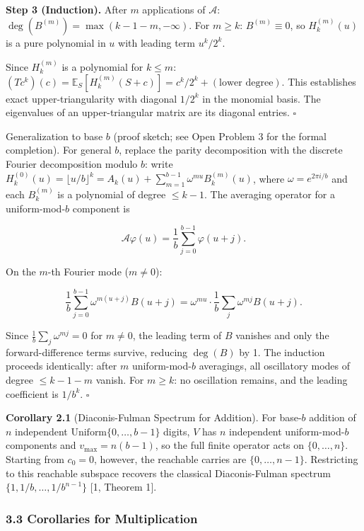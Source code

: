 \documentclass[
  11pt,
]{article}
\begin{document}
\textbf{Step 3 (Induction).} After \(m\) applications of \(\mathcal{A}\):
\(\deg(B^{(m)}) = \max(k - 1 - m, -\infty)\). For \(m \geq k\):
\(B^{(m)} \equiv 0\), so \(H_k^{(m)}(u)\) is a pure polynomial in \(u\) with
leading term \(u^k/2^k\).

Since \(H_k^{(m)}\) is a polynomial for \(k \leq m\):
\((Tc^k)(c) = \mathbb{E}_S[H_k^{(m)}(S+c)] = c^k/2^k + (\text{lower degree})\).
This establishes exact upper-triangularity with diagonal \(1/2^k\) in the
monomial basis. The eigenvalues of an upper-triangular matrix are its diagonal
entries. \(\square\)

Generalization to base \(b\) (proof sketch; see Open Problem 3 for the formal
completion). For general \(b\), replace the parity decomposition with the
discrete Fourier decomposition modulo \(b\): write
\(H_k^{(0)}(u) = \lfloor u/b \rfloor^k = A_k(u) + \sum_{m=1}^{b-1} \omega^{mu} B_k^{(m)}(u)\),
where \(\omega = e^{2\pi i/b}\) and each \(B_k^{(m)}\) is a polynomial of degree
\(\leq k-1\). The averaging operator for a uniform-mod-\(b\) component is

\[\mathcal{A}\varphi(u) = \frac{1}{b}\sum_{j=0}^{b-1} \varphi(u+j).\]

On the \(m\)-th Fourier mode (\(m \neq 0\)):

\[\frac{1}{b}\sum_{j=0}^{b-1} \omega^{m(u+j)} B(u+j) = \omega^{mu} \cdot \frac{1}{b}\sum_j \omega^{mj} B(u+j).\]

Since \(\frac{1}{b}\sum_j \omega^{mj} = 0\) for \(m \neq 0\), the leading term
of \(B\) vanishes and only the forward-difference terms survive, reducing
\(\deg(B)\) by 1. The induction proceeds identically: after \(m\)
uniform-mod-\(b\) averagings, all oscillatory modes of degree \(\leq k-1-m\)
vanish. For \(m \geq k\): no oscillation remains, and the leading coefficient is
\(1/b^k\). \(\square\)

\textbf{Corollary 2.1} (Diaconis-Fulman Spectrum for Addition). For base-\(b\)
addition of \(n\) independent \(\text{Uniform}\lbrace{}0, \ldots, b-1\rbrace{}\)
digits, \(V\) has \(n\) independent uniform-mod-\(b\) components and
\(v_{\max} = n(b-1)\), so the full finite operator acts on
\(\lbrace{}0, \ldots, n\rbrace{}\). Starting from \(c_0 = 0\), however, the
reachable carries are \(\lbrace{}0, \ldots, n-1\rbrace{}\). Restricting to this
reachable subspace recovers the classical Diaconis-Fulman spectrum
\(\lbrace{}1, 1/b, \ldots, 1/b^{n-1}\rbrace{}\) {[}1, Theorem 1{]}.

\subsubsection{3.3 Corollaries for
Multiplication}\label{corollaries-for-multiplication}
\end{document}
